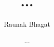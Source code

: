 \documentclass{article}
\begin{document}
\title{...}
\author{Raunak Bhagat}
\date{...}
\maketitle

\newpage

\end{document}
